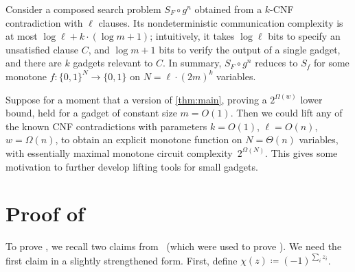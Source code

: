 \documentclass{toc}
\newcommand{\bit}{\{0,1\}}
\begin{document}
Consider a composed search problem $S_F\circ g^n$ obtained from a $k$-CNF contradiction with $\ell$ clauses. Its nondeterministic communication complexity is at most $\log\ell + k\cdot(\log m +1)$; intuitively, it takes $\log\ell$ bits to specify an unsatisfied clause $C$, and $\log m+1$ bits to verify the output of a single gadget, and there are $k$ gadgets relevant to $C$. In summary, $S_F \circ g^n$ reduces to $S_f$ for some monotone $f : \bit^N \to \bit$ on $N = \ell \cdot (2m)^k$ variables.

Suppose for a moment that a version of \autoref{thm:main}, proving a $2^{\Omega(w)}$ lower bound, held for a gadget of constant size $m=O(1)$. Then we could lift any of the known CNF contradictions with parameters $k=O(1)$, $\ell=O(n)$, $w=\Omega(n)$, to obtain an explicit monotone function on $N=\Theta(n)$ variables, with essentially maximal monotone circuit complexity~$2^{\Omega(N)}$. This gives some motivation to further develop lifting tools for small gadgets.

\section{Proof of }\label{sec:row-lem-proof}

To prove , we recall two claims from~\cite{goos17bpp} (which were used to prove ). We need the first claim in a slightly strengthened form. First, define $\chi(z) \coloneqq (-1)^{\sum_i z_i}$.
\end{document}
